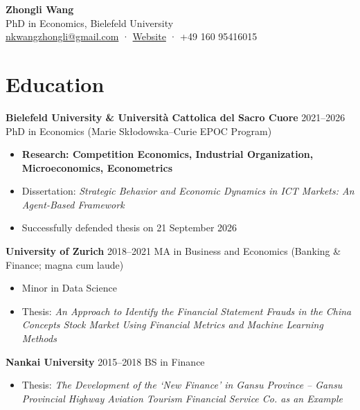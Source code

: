 \documentclass[a4paper,11pt]{article}
\begin{document}
\begin{center}
{\LARGE \textbf{Zhongli Wang}}\\[4pt]
PhD in Economics, Bielefeld University\\
\href{mailto:nkwangzhongli@gmail.com}{nkwangzhongli@gmail.com} · 
\href{https://sites.google.com/view/zhongli-wang}{Website} · 
+49 160 95416015
\end{center}

\section{Education}

\textbf{Bielefeld University \& Università Cattolica del Sacro Cuore} \hfill 2021–2026  
\newline PhD in Economics (Marie Skłodowska–Curie EPOC Program)  
\begin{itemize}
\item \textbf{Research: Competition Economics, Industrial Organization, Microeconomics, Econometrics}  
\item Dissertation: \emph{Strategic Behavior and Economic Dynamics in ICT Markets: An Agent-Based Framework}  
\item Successfully defended thesis on 21 September 2026  
\end{itemize}

\textbf{University of Zurich} \hfill 2018–2021  
\newline MA in Business and Economics (Banking \& Finance; magna cum laude)  
\begin{itemize}
\item Minor in Data Science  
\item Thesis: \textit{An Approach to Identify the Financial Statement Frauds in the China Concepts Stock Market Using Financial Metrics and Machine Learning Methods}   
\end{itemize}

\textbf{Nankai University} \hfill 2015–2018  
\newline BS in Finance  
\begin{itemize}
    \item Thesis: \textit{The Development of the `New Finance' in Gansu Province – Gansu Provincial Highway Aviation Tourism Financial Service Co. as an Example}
\end{itemize}
\end{document}
